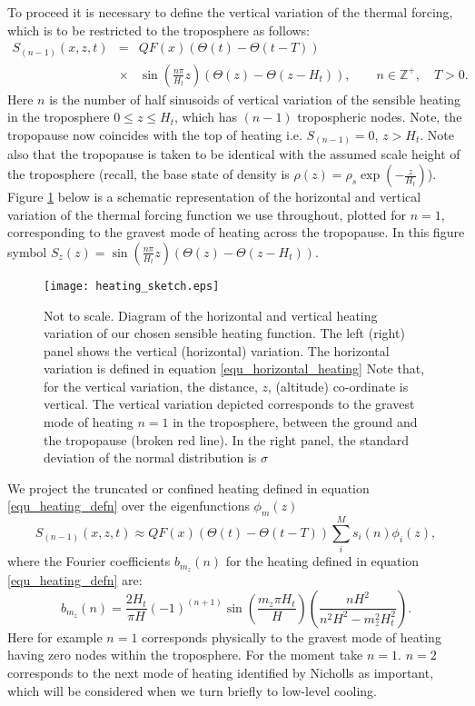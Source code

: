 \documentclass[a4paper,10pt]{article}
\newcommand{\heavi}{\Theta}
\begin{document}
To proceed it is necessary to define the vertical variation of the thermal forcing, which is to be restricted to the troposphere as follows:
%
\begin{eqnarray}
\label{equ_heating_defn}
S_{(n-1)}(x,z,t) & = & Q F(x) \left( \heavi(t) - \heavi(t-T) \right) \\ \nonumber
           & \times & \sin \left( \frac{n \pi}{H_t} z \right)  (\heavi(z) - \heavi(z-H_t)), \quad \quad n \in \mathbb{Z}^+, \quad T>0.
\end{eqnarray}
%
Here $n$ is the number of half sinusoids of vertical variation of the sensible heating in the troposphere $0\leq z \leq H_t$,
which has $(n-1)$ tropospheric nodes. Note, the tropopause now coincides with the top of heating i.e. $S_{(n-1)} =0$, $z>H_t$.
Note also that the tropopause is taken to be identical with the assumed scale height of the troposphere (recall, 
the base state of density is $\rho(z) = \rho_s \exp \left( - \frac{z}{H_t} \right)$). 
Figure \ref{heating diagram} below is a schematic representation of the horizontal and vertical variation of the thermal forcing function 
we use throughout, plotted for $n=1$, corresponding to the gravest mode of heating across the tropopause. 
In this figure symbol $S_z (z) =  \sin \left( \frac{n \pi}{H_t} z \right) \left( \heavi(z) - \heavi(z-H_t) \right)$.
%
%
\begin{figure}[h!]
\caption{ Not to scale. Diagram of the horizontal and vertical heating variation of our
	      chosen sensible heating function. 
              The left (right) panel shows the vertical (horizontal) variation. 
              The horizontal variation is defined in equation \ref{equ_horizontal_heating}
              Note that, for the vertical variation, the distance, $z$, (altitude) co-ordinate is vertical. 
              The vertical variation depicted corresponds to the gravest mode of heating 
              $n=1$ in the troposphere, between the ground and the tropopause (broken red line). 
              In the right panel, the standard deviation of the normal distribution is $\sigma$ }
  \centering
    \texttt{[image: heating\_sketch.eps]}
  \label{heating diagram}
\end{figure}
%
 
We project the truncated or confined heating defined in equation \ref{equ_heating_defn} 
over the eigenfunctions $\phi_m(z)$ 
%
\begin{equation}
\label{equ_1}
S_{(n-1)} (x,z,t) \approx Q F(x) \left( \heavi(t) - \heavi(t-T) \right) \sum_{i}^{M} s_i (n) \phi_i (z),
\end{equation}
%
where the Fourier coefficients $b_{m_z}(n)$ for the heating defined in equation \ref{equ_heating_defn} are:
%
\begin{equation}
b_{m_z} (n) = \frac{ 2  H_t } { \pi H } (-1)^{(n+1)} \sin \left( \frac{m_z \pi H_t }{ H } \right) \left( \frac{ n H^2 }{ n^2 H^2 - m_z^2 H_t^2 } \right).
\end{equation}
%
Here for example $n=1$ corresponds physically to the gravest mode of heating having zero nodes within the troposphere.
For the moment take $n=1$. $n=2$ corresponds to the next mode of heating identified by Nicholls as important, which will be considered when we
turn briefly to low-level cooling. 
\end{document}
